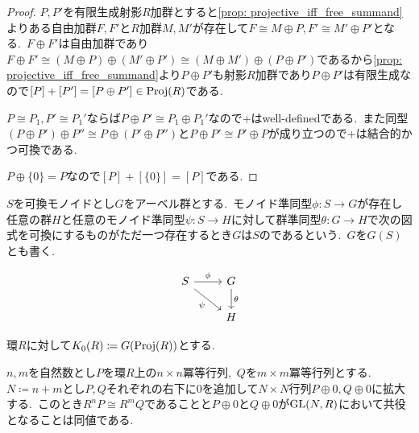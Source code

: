 \begin{proof}
$P,P'$を有限生成射影$R$加群とすると\cref{prop: projective_iff_free_summand}よりある自由加群$F,F'$と$R$加群$M,M'$が存在して$F \cong M \oplus P, F' \cong M' \oplus P'$となる.\
$F \oplus F'$は自由加群であり$F \oplus F' \cong (M \oplus P) \oplus (M' \oplus P') \cong (M \oplus M') \oplus (P \oplus P')$であるから\cref{prop: projective_iff_free_summand}より$P \oplus P'	$も射影$R$加群であり$P \oplus P'$は有限生成なので$[P] + [P'] = [P \oplus P'] \in \operatorname{Proj}(R)$である.

$P \cong P_1, P' \cong P_1'$ならば$P \oplus P' \cong P_1 \oplus P_1'$なので$+$はwell-definedである.\
また同型$(P \oplus P') \oplus P'' \cong P \oplus (P' \oplus P'')$と$P \oplus P' \cong P' \oplus P$が成り立つので$+$は結合的かつ可換である.

$P \oplus \{0\} = P$なので$[P] + [\{0\}] = [P]$である.
\end{proof}

\begin{definition} \label{def: grothendieckGroup}
$S$を可換モノイドとし$G$をアーベル群とする.\
モノイド準同型$\phi \colon S \to G$が存在し任意の群$H$と任意のモノイド準同型$\psi \colon S \to H$に対して群準同型$\theta \colon G \to H$で次の図式を可換にするものがただ一つ存在するとき$G$は$S$のであるという.\
$G$を$G(S)$とも書く.

\[\begin{tikzcd}
	S & G \\
	& H
	\arrow["\phi", from=1-1, to=1-2]
	\arrow["\psi"', from=1-1, to=2-2]
	\arrow["\theta", from=1-2, to=2-2]
\end{tikzcd}\]
\end{definition}

\begin{definition} \label{def: k0}
環$R$に対して$K_0(R) \coloneq G(\operatorname{Proj}(R))$とする.
\end{definition}

\begin{lemma} \label{lem: idempotent_iso_iff_conjugate}
$n, m$を自然数とし$P$を環$R$上の$n \times n$冪等行列,\ $Q$を$m \times m$冪等行列とする.\
$N \coloneq n + m$とし$P, Q$それぞれの右下に$0$を追加して$N \times N$行列$P \oplus 0, Q \oplus 0$に拡大する.\
このとき$R^n P \cong R^m Q$であることと$P \oplus 0$と$Q \oplus 0$が$\operatorname{GL}(N, R)$において共役となることは同値である.
\end{lemma}


